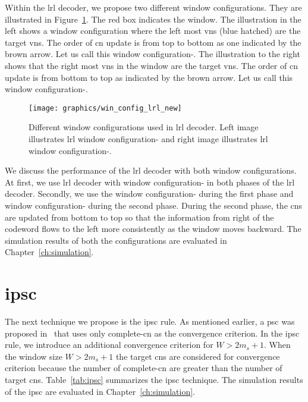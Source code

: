 Within the \gls{lrl} decoder, we propose two different window configurations. They are illustrated in Figure~\ref{fig:win_config_lrl}. The red box indicates the window. The illustration in the left shows a window configuration where the left most \glspl{vn} (blue hatched) are the target \glspl{vn}. The order of \gls{cn} update is from top to bottom as one indicated by the brown arrow. Let us call this window configuration-. The illustration to the right shows that the right most \glspl{vn} in the window are the target \glspl{vn}. The order of \gls{cn} update is from bottom to top as indicated by the brown arrow. Let us call this window configuration-.

\begin{figure}[htbp]
  \centering
  \texttt{[image: graphics/win\_config\_lrl\_new]}
  \caption[Different window configurations used in \acrshort{lrl} decoder.]{Different window configurations used in \gls{lrl} decoder. Left image illustrates \gls{lrl} window configuration- and right image illustrates \gls{lrl} window configuration-.}
  \label{fig:win_config_lrl}
\end{figure}

We discuss the performance of the \gls{lrl} decoder with both window configurations. At first, we use \gls{lrl} decoder with window configuration- in both phases of the \gls{lrl} decoder. Secondly, we use the window configuration- during the first phase and window configuration- during the second phase. During the second phase, the \glspl{cn} are updated from bottom to top so that the information from right of the codeword flows to the left more consistently as the window moves backward. The simulation results of both the configurations are evaluated in Chapter~\ref{ch:simulation}.

\section{\texorpdfstring{\acrlong{ipsc}}{IPSC}}
The next technique we propose is the \gls{ipsc} rule. As mentioned earlier, a \gls{psc} was proposed in~\cite{Kang2018} that uses only complete-\gls{cn} as the convergence criterion. In the \gls{ipsc} rule, we introduce an additional convergence criterion for $W>2m_s+1$. When the window size $W>2m_s+1$ the target \glspl{cn} are considered for convergence criterion because the number of complete-\gls{cn} are greater than the number of target \glspl{cn}. Table~\ref{tab:ipsc} summarizes the \gls{ipsc} technique. The simulation results of the \gls{ipsc} are evaluated in Chapter~\ref{ch:simulation}.

